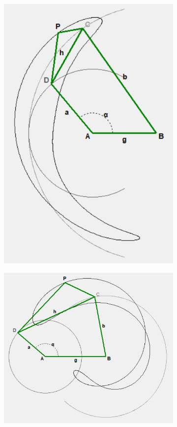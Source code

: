 \documentclass{article}
\begin{document}
\begin{figure}[h]
\begin{subfigure}{0.19\textwidth}
		\caption{}
	\end{subfigure}
	\hfill
	\begin{subfigure}{0.19\textwidth}
		\centering
		\includegraphics[width=\linewidth, height=0.95\linewidth, keepaspectratio]{./Figures/27_motion_cases/-111.png}
		\caption{}
	\end{subfigure}
	\hfill
	\begin{subfigure}{0.19\textwidth}
		\centering
		\includegraphics[width=\linewidth, height=0.95\linewidth, keepaspectratio]{./Figures/27_motion_cases/101.png}

\end{subfigure}
\end{figure}
\end{document}
